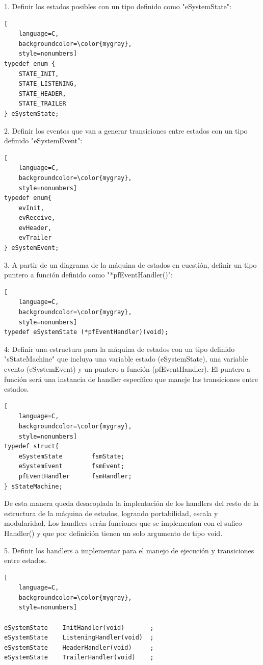 1. Definir los estados posibles con un tipo definido como "eSystemState":

\begin{lstlisting}[
	language=C, 
	backgroundcolor=\color{mygray},
	style=nonumbers]
typedef enum {
	STATE_INIT,
	STATE_LISTENING,
	STATE_HEADER,
	STATE_TRAILER
} eSystemState;
\end{lstlisting}

2. Definir los eventos que van a generar transiciones entre estados con un tipo definido "eSystemEvent":

\begin{lstlisting}[
	language=C, 
	backgroundcolor=\color{mygray},
	style=nonumbers]
typedef enum{
	evInit,
	evReceive,
	evHeader,
	evTrailer
} eSystemEvent;
\end{lstlisting}

3. A partir de un diagrama de la máquina de estados en cuestión, 
definir un tipo puntero a función definido como "*pfEventHandler()":

\begin{lstlisting}[
	language=C, 
	backgroundcolor=\color{mygray},
	style=nonumbers]
typedef eSystemState (*pfEventHandler)(void);
\end{lstlisting}

4: Definir una estructura para la máquina de estados con un tipo definido "sStateMachine" que incluya una variable estado (eSystemState), una variable evento (eSystemEvent) y un puntero a función (pfEventHandler). El puntero a función será una instancia de handler específico que maneje las transiciones entre estados. 

\begin{lstlisting}[
	language=C, 
	backgroundcolor=\color{mygray},
	style=nonumbers]
typedef struct{
	eSystemState 		fsmState;
	eSystemEvent 		fsmEvent;
	pfEventHandler 		fsmHandler;
} sStateMachine;
\end{lstlisting}

De esta manera queda desacoplada la implentación de los handlers del resto de la estructura de la máquina de estados, logrando portabilidad, escala y modularidad. Los handlers serán funciones que se implementan con el sufico Handler() y que por definición tienen un solo argumento de tipo void.

5. Definir los handlers a implementar para el manejo de ejecución y transiciones entre estados.

\begin{lstlisting}[
	language=C, 
	backgroundcolor=\color{mygray},
	style=nonumbers]

eSystemState 	InitHandler(void)		;
eSystemState 	ListeningHandler(void)	;
eSystemState 	HeaderHandler(void)		;
eSystemState 	TrailerHandler(void) 	;

\end{lstlisting}

